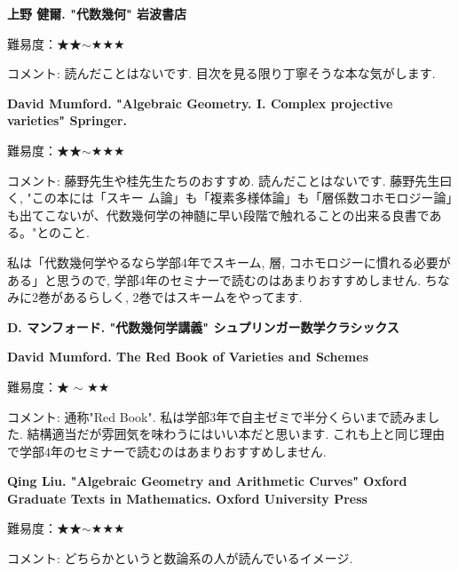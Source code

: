 \textbf{上野 健爾. "代数幾何" 岩波書店}\vspace{-6pt}

難易度：★★$\sim$★★★  \vspace{-6pt}

コメント:  読んだことはないです. 目次を見る限り丁寧そうな本な気がします.  
\vspace{8pt}

\textbf{David Mumford. "Algebraic Geometry. I. Complex projective varieties" Springer.}\vspace{-6pt}

難易度：★★$\sim$★★★  \vspace{-6pt}

コメント:  藤野先生や桂先生たちのおすすめ.  読んだことはないです. 藤野先生曰く, "この本には「スキー
ム論」も「複素多様体論」も「層係数コホモロジー論」も出てこないが、代数幾何学の神髄に早い段階で触れることの出来る良書である。"とのこと. 

私は「代数幾何学やるなら学部4年でスキーム, 層, コホモロジーに慣れる必要がある」と思うので, 学部4年のセミナーで読むのはあまりおすすめしません. ちなみに2巻があるらしく, 2巻ではスキームをやってます. 
\vspace{8pt}

\textbf{D. マンフォード. "代数幾何学講義" シュプリンガー数学クラシックス}\vspace{-6pt}

\textbf{David Mumford. The Red Book of Varieties and Schemes}\vspace{-6pt}

難易度：★ $\sim$ ★★ \vspace{-6pt}

コメント:  通称"Red Book". 私は学部3年で自主ゼミで半分くらいまで読みました. 結構適当だが雰囲気を味わうにはいい本だと思います. これも上と同じ理由で学部4年のセミナーで読むのはあまりおすすめしません. 
\vspace{8pt}


\textbf{Qing Liu. "Algebraic Geometry and Arithmetic Curves" Oxford Graduate Texts in Mathematics. Oxford University Press}

難易度：★★$\sim$★★★  \vspace{-6pt}

コメント: どちらかというと数論系の人が読んでいるイメージ. 
\vspace{8pt}

